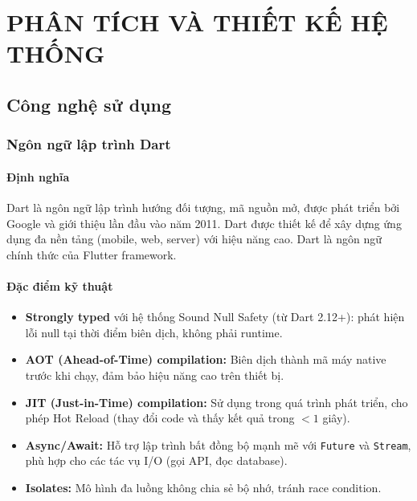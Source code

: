 \chapter{PHÂN TÍCH VÀ THIẾT KẾ HỆ THỐNG}

\section{Công nghệ sử dụng}

\subsection{Ngôn ngữ lập trình Dart}

\subsubsection{Định nghĩa}

Dart là ngôn ngữ lập trình hướng đối tượng, mã nguồn mở, được phát triển bởi Google và giới thiệu lần đầu vào năm 2011. Dart được thiết kế để xây dựng ứng dụng đa nền tảng (mobile, web, server) với hiệu năng cao. Dart là ngôn ngữ chính thức của Flutter framework.

\subsubsection{Đặc điểm kỹ thuật}

\begin{itemize}
  \item \textbf{Strongly typed} với hệ thống Sound Null Safety (từ Dart 2.12+): phát hiện lỗi null tại thời điểm biên dịch, không phải runtime.
  \item \textbf{AOT (Ahead-of-Time) compilation:} Biên dịch thành mã máy native trước khi chạy, đảm bảo hiệu năng cao trên thiết bị.
  \item \textbf{JIT (Just-in-Time) compilation:} Sử dụng trong quá trình phát triển, cho phép Hot Reload (thay đổi code và thấy kết quả trong $<1$ giây).
  \item \textbf{Async/Await:} Hỗ trợ lập trình bất đồng bộ mạnh mẽ với \texttt{Future} và \texttt{Stream}, phù hợp cho các tác vụ I/O (gọi API, đọc database).
  \item \textbf{Isolates:} Mô hình đa luồng không chia sẻ bộ nhớ, tránh race condition.
\end{itemize}

